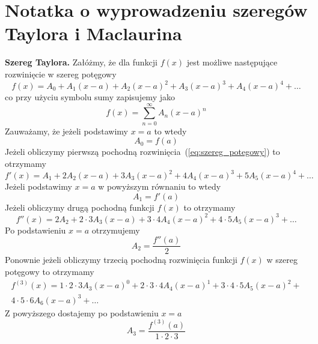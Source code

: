\documentclass[12pt]{article}
\begin{document}
\section*{Notatka o wyprowadzeniu szeregów Taylora \newline i Maclaurina}



{\bf Szereg Taylora.\/} Załóżmy, że dla funkcji $f(x)$ jest możliwe następujące rozwinięcie
w szereg potęgowy
\begin{equation}
\label{eq:szereg_potegowy}
f(x) = A_{0} + A_{1} (x-a) + A_{2} (x-a)^{2} + A_{3} (x-a)^{3} 
+ A_{4} (x-a)^{4} + \ldots
\end{equation}
co przy użyciu symbolu sumy zapisujemy jako
\begin{equation}
f(x)
=
\sum_{n=0}^{\infty}  A_{n} (x-a)^{n}
\end{equation}
Zauważamy, że jeżeli podstawimy $x = a$ to wtedy
\begin{equation}
A_{0} = f(a)
\end{equation}
Jeżeli obliczymy pierwszą pochodną rozwinięcia~(\ref{eq:szereg_potegowy})
to otrzymamy
\begin{equation}
f'(x) = A_{1} + 2A_{2} (x-a) + 3A_{3} (x-a)^{2} + 4A_{4} (x-a)^{3} 
+ 5A_{5} (x-a)^{4} + \ldots
\end{equation}
Jeżeli podstawimy $x = a$ w powyższym równaniu to wtedy
\begin{equation}
A_{1} = f'(a)
\end{equation}
Jeżeli obliczymy drugą pochodną funkcji $f(x)$ to otrzymamy
\begin{equation}
f''(x) = 2 A_{2}  + 2 \cdot 3 A_{3} (x-a) + 3 \cdot 4 A_{4} (x-a)^{2} 
+ 4 \cdot 5 A_{5} (x-a)^{3} + \ldots
\end{equation}
Po podstawieniu $x = a$ otrzymujemy
\begin{equation}
A_{2} = \frac{f''(a)}{2}
\end{equation}
Ponownie jeżeli obliczymy trzecią pochodną rozwinięcia funkcji $f(x)$ w szereg 
potęgowy to otrzymamy
\begin{eqnarray}
f^{(3)}(x) = 
1 \cdot 2 \cdot 3 A_{3} (x-a)^{0} + 
2 \cdot 3 \cdot 4 A_{4} (x-a)^{1} + 
3 \cdot 4 \cdot 5 A_{5} (x-a)^{2} + \\ \nonumber
4 \cdot 5 \cdot 6 A_{6} (x-a)^{3} + \ldots
\end{eqnarray}
Z powyższego dostajemy po podstawieniu $x=a$
\begin{equation}
A_{3} = \frac{f^{(3)}(a)}{1 \cdot 2 \cdot 3}
\end{equation}
\end{document}

